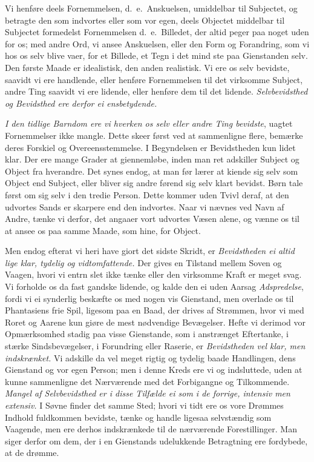 \documentclass[12pt,a4paper]{article}
\newcommand{\opage}[1]{\marginnote{\footnotesize\textit{[#1]}}}
\begin{document}
Vi henføre deels Fornemmelsen, d.~e.\ Anskuelsen, umiddelbar til Subjectet, og
betragte den som indvortes eller som vor egen, deels Objectet middelbar til
Subjectet formedelst Fornemmelsen d.~e.\ Billedet, der altid peger paa noget uden
for os; med andre Ord, vi ansee Anskuelsen, eller den Form og Forandring, som vi
hos os selv blive vaer, for et Billede, et Tegn i det mind%
\opage{38}ste paa Gienstanden selv. Den første Maade er idealistisk, den anden realistisk. Vi
ere os selv bevidste, saavidt vi ere handlende, eller henføre Fornemmelsen til det
virksomme Subject, andre Ting saavidt vi ere lidende, eller henføre dem til det
lidende. \emph{Selvbevidsthed og Bevidsthed ere derfor ei ensbetydende.}

\emph{I den tidlige Barndom ere vi hverken os selv eller andre Ting bevidste},
uagtet Fornemmelser ikke mangle. Dette skeer først ved at sammenligne flere,
bemærke deres Forskiel og Overeensstemmelse. I Begyndelsen er Bevidstheden kun lidet
klar. Der ere mange Grader at giennemløbe, inden man ret adskiller Subject og Object
fra hverandre. Det synes endog, at man før lærer at kiende sig selv som Object end
Subject, eller bliver sig andre førend sig selv klart bevidst. Børn tale først om
sig selv i den tredie Person. Dette kommer uden Tvivl deraf, at den udvortes Sands
er skarpere end den indvortes. Naar vi nævnes ved Navn af Andre, tænke vi derfor,
det angaaer vort udvortes Væsen alene, og vænne os til at ansee os paa samme Maade,
som hine, for Object.

Men endog efterat vi heri have giort det sidste Skridt, er \emph{Bevidstheden ei
altid lige klar, tydelig og vidtomfattende.} Der gives en Tilstand mellem Soven og
Vaagen, hvori vi entrn slet ikke tænke eller den virksomme Kraft er meget svag.
\opage{39} Vi forholde os da fast gandske lidende, og kalde den ei uden Aarsag
\emph{Adspredelse}, fordi vi ei synderlig beskæfte os med nogen vis Gienstand, men
overlade os til Phantasiens frie Spil, ligesom paa en Baad, der drives af Strømmen,
hvor vi med Roret og Aarene kun giøre de mest nødvendige Bevægelser. Hefte vi
derimod vor Opmærksomhed stadig paa visse Gienstande, som i anstrænget Eftertanke, i
stærke Sindsbevægelser, i Forundring eller Raserie, er \emph{Bevidstheden vel klar,
men indskrænket.} Vi adskille da vel meget rigtig og tydelig baade Handlingen, dens
Gienstand og vor egen Person; men i denne Kreds ere vi og indsluttede, uden at kunne
sammenligne det Nærværende med det Forbigangne og Tilkommende. \emph{Mangel af
Selvbevidsthed er i disse Tilfælde ei som i de forrige, intensiv men extensiv.} I
Søvne finder det samme Sted; hvori vi tidt ere os vore Drømmes Indhold fuldkommen
bevidste, tænke og handle ligesaa selvstændig som Vaagende, men ere derhos
indskrænkede til de nærværende Forestillinger. Man siger derfor om dem, der i en
Gienstands udelukkende Betragtning ere fordybede, at de drømme.
\end{document}
